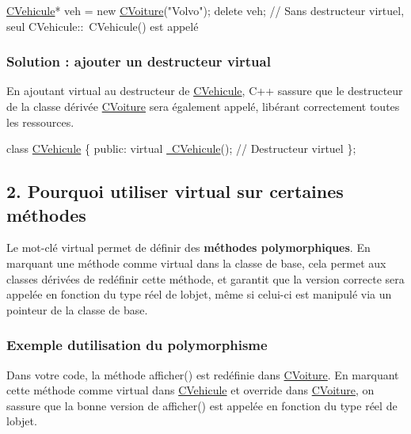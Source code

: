 \begin{DoxyCode}
\hyperlink{classCVehicule}{CVehicule}* veh = \textcolor{keyword}{new} \hyperlink{classCVoiture}{CVoiture}(\textcolor{stringliteral}{"Volvo"});
\textcolor{keyword}{delete} veh; \textcolor{comment}{// Sans destructeur virtuel, seul CVehicule::~CVehicule() est appelé}
\end{DoxyCode}


\subsubsection*{Solution \+: ajouter un destructeur {\ttfamily virtual}}

En ajoutant {\ttfamily virtual} au destructeur de {\ttfamily \hyperlink{classCVehicule}{C\+Vehicule}}, C++ s\textquotesingle{}assure que le destructeur de la classe dérivée {\ttfamily \hyperlink{classCVoiture}{C\+Voiture}} sera également appelé, libérant correctement toutes les ressources.


\begin{DoxyCode}
\textcolor{keyword}{class }\hyperlink{classCVehicule}{CVehicule} \{
\textcolor{keyword}{public}:
    \textcolor{keyword}{virtual} \hyperlink{classCVehicule_a149e48f61193e22310c87a418f11fcc3}{~CVehicule}(); \textcolor{comment}{// Destructeur virtuel}
\};
\end{DoxyCode}


\subsection*{2. Pourquoi utiliser {\ttfamily virtual} sur certaines méthodes}

Le mot-\/clé {\ttfamily virtual} permet de définir des {\bfseries méthodes polymorphiques}. En marquant une méthode comme {\ttfamily virtual} dans la classe de base, cela permet aux classes dérivées de redéfinir cette méthode, et garantit que la version correcte sera appelée en fonction du type réel de l\textquotesingle{}objet, même si celui-\/ci est manipulé via un pointeur de la classe de base.

\subsubsection*{Exemple d\textquotesingle{}utilisation du polymorphisme}

Dans votre code, la méthode {\ttfamily afficher()} est redéfinie dans {\ttfamily \hyperlink{classCVoiture}{C\+Voiture}}. En marquant cette méthode comme {\ttfamily virtual} dans {\ttfamily \hyperlink{classCVehicule}{C\+Vehicule}} et {\ttfamily override} dans {\ttfamily \hyperlink{classCVoiture}{C\+Voiture}}, on s\textquotesingle{}assure que la bonne version de {\ttfamily afficher()} est appelée en fonction du type réel de l\textquotesingle{}objet.


